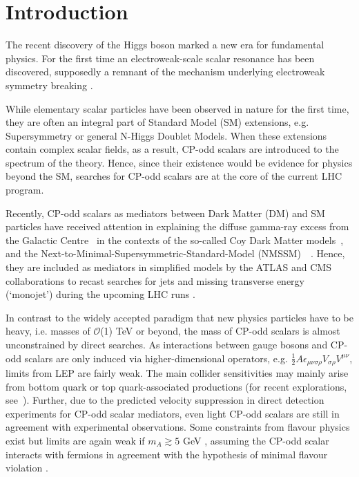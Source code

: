 \section{Introduction}
\label{sec:intro}
The recent discovery of the Higgs boson \cite{Chatrchyan:2012ufa,Aad:2012tfa} marked a new era for fundamental physics. For the first time an electroweak-scale scalar resonance has been discovered, supposedly a remnant of the mechanism underlying electroweak symmetry breaking \cite{orig}.

While elementary scalar particles have been observed in nature for the first time, they are often an integral part of Standard Model (SM) extensions, e.g. Supersymmetry or general N-Higgs Doublet Models. When these extensions contain complex scalar fields, as a result, CP-odd scalars are introduced to the spectrum of the theory. Hence, since their existence would be evidence for physics beyond the SM, searches for CP-odd scalars are at the core of the 
current LHC program. 

Recently, CP-odd scalars as mediators between Dark Matter (DM) and SM particles have received attention in explaining the diffuse gamma-ray excess from the Galactic Centre~\cite{Goodenough:2009gk,Hooper:2010mq,Abazajian:2012pn,Daylan:2014rsa} in the contexts of the so-called Coy Dark Matter models~\cite{Boehm:2014hva,Hektor:2014kga,Arina:2014yna}, and the Next-to-Minimal-Supersymmetric-Standard-Model (NMSSM)~~\cite{Cheung:2014lqa,Huang:2014cla}. Hence, they are included as mediators in simplified models by the ATLAS and CMS collaborations to recast searches for  jets and missing transverse energy (`monojet') during the upcoming LHC runs \cite{Malik:2014ggr,Abdallah:2014hon}.

In contrast to the widely accepted paradigm that new physics particles have to be heavy, i.e. masses of $\mathcal{O}$(1) TeV or beyond, the mass of CP-odd scalars is almost unconstrained by direct searches. As interactions between gauge bosons and CP-odd scalars are only induced via higher-dimensional operators, e.g. $\frac{1}{2} A \epsilon_{\mu \nu \sigma \rho} V_{\sigma \rho} V^{\mu \nu}$, limits from LEP are fairly weak. The main collider sensitivities may mainly arise from bottom quark or top quark-associated productions (for recent explorations, see~\cite{Craig:2015jba,Hajer:2015gka}). Further, due to the predicted velocity suppression in direct detection experiments for CP-odd scalar mediators, even light CP-odd scalars are still in agreement with experimental observations. Some constraints from flavour physics exist but limits are again weak if $m_A \gtrsim 5$ GeV \cite{Dolan:2014ska}, assuming the CP-odd scalar interacts with fermions in agreement with the hypothesis of minimal flavour violation \cite{D'Ambrosio:2002ex}. 

